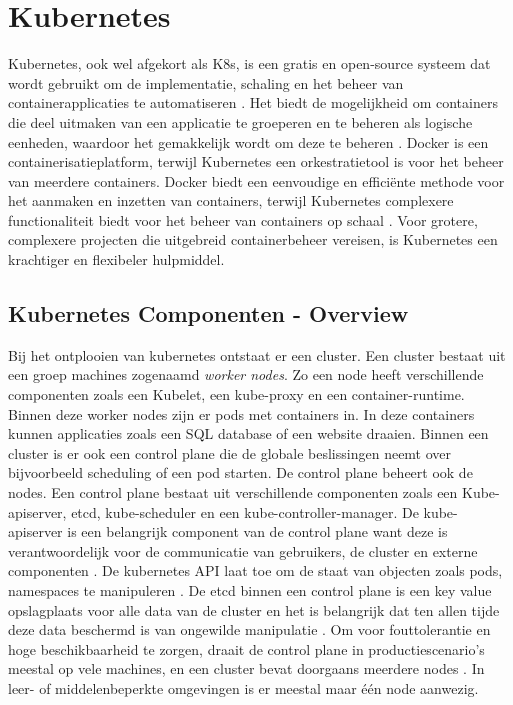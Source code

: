 \section{Kubernetes}
Kubernetes, ook wel afgekort als K8s, is een gratis en open-source systeem dat wordt gebruikt om de implementatie, schaling en het beheer van containerapplicaties te automatiseren \autocite{KubernetesDocs-2023}. 
Het biedt de mogelijkheid om containers die deel uitmaken van een applicatie te groeperen en te beheren als logische eenheden, waardoor het gemakkelijk wordt om deze te beheren \autocite{KubernetesDocs-2023}.
Docker is een containerisatieplatform, terwijl Kubernetes een orkestratietool is voor het beheer van meerdere containers.
Docker biedt een eenvoudige en efficiënte methode voor het aanmaken en inzetten van containers, terwijl Kubernetes complexere functionaliteit biedt voor het beheer van containers op schaal \autocite{banerjee-2023}.
Voor grotere, complexere projecten die uitgebreid containerbeheer vereisen, is Kubernetes een krachtiger en flexibeler hulpmiddel.

\subsection{Kubernetes Componenten - Overview}
\autocite{KubernetesDocs-2023} Bij het ontplooien van kubernetes ontstaat er een cluster. Een cluster bestaat uit een groep machines zogenaamd \textit{worker nodes}. Zo een node heeft verschillende componenten zoals een Kubelet, een kube-proxy en een container-runtime.
Binnen deze worker nodes zijn er pods met containers in. In deze containers kunnen applicaties zoals een SQL database of een website draaien. 
\autocite{KubernetesDocs-2023} Binnen een cluster is er ook een control plane die de globale beslissingen neemt over bijvoorbeeld scheduling of een pod starten. De control plane beheert ook de nodes. 
\autocite{KubernetesDocs-2023} Een control plane bestaat uit verschillende componenten zoals een Kube-apiserver, etcd, kube-scheduler en een kube-controller-manager. 
De kube-apiserver is een belangrijk component van de control plane want deze is verantwoordelijk voor de communicatie van gebruikers, de cluster en externe componenten \autocite{hohn-2020}. 
De kubernetes API laat toe om de staat van objecten zoals pods, namespaces te manipuleren \autocite{KubernetesDocs-2023}.
De etcd binnen een control plane is een key value opslagplaats voor alle data van de cluster en het is belangrijk dat ten allen tijde deze data beschermd is van ongewilde manipulatie \autocite{KubernetesDocs-2023}. 
Om voor fouttolerantie en hoge beschikbaarheid te zorgen, draait de control plane in productiescenario's meestal op vele machines, en een cluster bevat doorgaans meerdere nodes \autocite{KubernetesDocs-2023}. 
In leer- of middelenbeperkte omgevingen is er meestal maar één node aanwezig.

